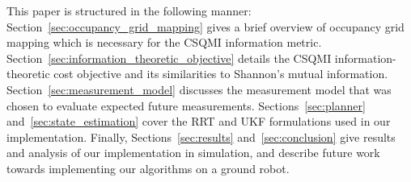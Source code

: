 This paper is structured in the following manner: Section~\ref{sec:occupancy_grid_mapping}
gives a brief overview of occupancy grid mapping which is necessary for the CSQMI
information metric. Section~\ref{sec:information_theoretic_objective}
details the CSQMI information-theoretic cost objective and its similarities to
Shannon's mutual information. Section~\ref{sec:measurement_model} discusses the
measurement model that was chosen to evaluate expected future measurements.
Sections~\ref{sec:planner} and~\ref{sec:state_estimation} cover the RRT and UKF formulations
used in our implementation. Finally, Sections~\ref{sec:results}
and~\ref{sec:conclusion} give results and analysis of our implementation in
simulation, and describe future work towards implementing our algorithms on a
ground robot.
